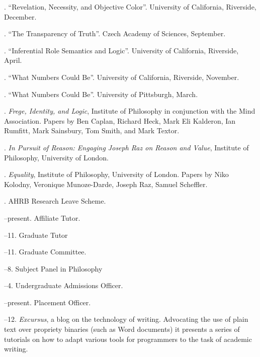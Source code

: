 \documentclass[11pt]{article}
\begin{document}
. ``Revelation, Necessity, and Objective Color''. University of California, Riverside, December.

. ``The Transparency of Truth''. Czech Academy of Sciences, September.

. ``Inferential Role Semantics and Logic''. University of California, Riverside, April.

. ``What Numbers Could Be''. University of California, Riverside, November.

. ``What Numbers Could Be''. University of Pittsburgh, March.



\bigskip

\medskip

. \emph{Frege, Identity, and Logic}, Institute of Philosophy in conjunction with the Mind Association. Papers by Ben Caplan, Richard Heck, Mark Eli Kalderon, Ian Rumfitt, Mark Sainsbury, Tom Smith, and Mark Textor.

. \emph{In Pursuit of Reason: Engaging Joseph Raz on Reason and Value}, Institute of Philosophy, University of London.

. \emph{Equality}, Institute of Philosophy, University of London. Papers by Niko Kolodny, Veronique Munoze-Darde, Joseph Raz, Samuel Scheffler.

\bigskip

\medskip
  
. AHRB Research Leave Scheme.

\bigskip 

\medskip

--present. Affiliate Tutor.

--11. Graduate Tutor

--11. Graduate Committee.

--8. Subject Panel in Philosophy

--4. Undergraduate Admissions Officer.

--present. Placement Officer.

\bigskip

\medskip

--12. \emph{Excursus}, a blog on the technology of writing. Advocating the use of plain text over propriety binaries (such as Word documents) it presents a series of tutorials on how to adapt various tools for programmers to the task of academic writing.
\end{document}
